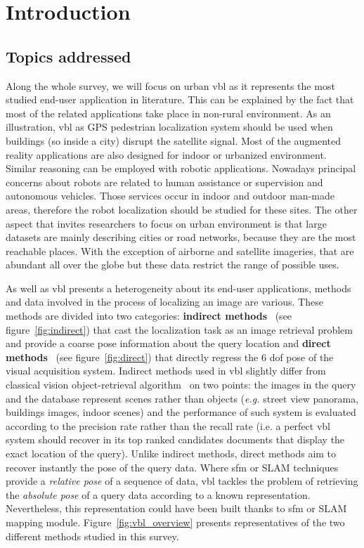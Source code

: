 \section{Introduction}
\label{sec:introduction}
	
	\subsection{Topics addressed}
		Along the whole survey, we will focus on urban \ac{vbl} as it represents the most studied end-user application in literature. This can be explained by the fact that most of the related applications take place in non-rural environment. As an illustration, \ac{vbl} as GPS pedestrian localization system should be used when buildings (so inside a city) disrupt the satellite signal. Most of the augmented reality applications are also designed for indoor or urbanized environment. Similar reasoning can be employed with robotic applications. Nowadays principal concerns about robots are related to human assistance or supervision and autonomous vehicles. Those services occur in indoor and outdoor man-made areas, therefore the robot localization should be studied for these sites. The other aspect that invites researchers to focus on urban environment is that large datasets are mainly describing cities or road networks, because they are the most reachable places. With the exception of airborne and satellite imageries, that are abundant all over the globe but these data restrict the range of possible uses.
				
		As well as \ac{vbl} presents a heterogeneity about its end-user applications, methods and data involved in the process of localizing an image are various. These methods are divided into two categories: \textbf{indirect methods}~\citep{Arandjelovic2012,Radenovic2016} (see figure~\ref{fig:indirect}) that cast the localization task as an image retrieval problem and provide a coarse pose information about the query location and \textbf{direct methods}~\citep{Kendall2015,Sattler2016a} (see figure~\ref{fig:direct}) that directly regress the 6 \ac{dof} pose of the visual acquisition system. Indirect methods used in \ac{vbl} slightly differ from classical vision object-retrieval algorithm~\citep{Sivic2003} on two points: the images in the query and the database represent scenes rather than objects (\textit{e.g.} street view panorama, buildings images, indoor scenes) and the performance of such system is evaluated according to the precision rate rather than the recall rate (i.e. a perfect \ac{vbl} system should recover in its top ranked candidates documents that display the exact location of the query). Unlike indirect methods, direct methods aim to recover instantly the pose of the query data. Where \ac{sfm} or SLAM techniques provide a \textit{relative pose} of a sequence of data, \ac{vbl} tackles the problem of retrieving the \textit{absolute pose} of a query data according to a known representation. Nevertheless, this representation could have been built thanks to \ac{sfm} or SLAM mapping module.
Figure~\ref{fig:vbl_overview} presents representatives of the two different methods studied in this survey.
			
